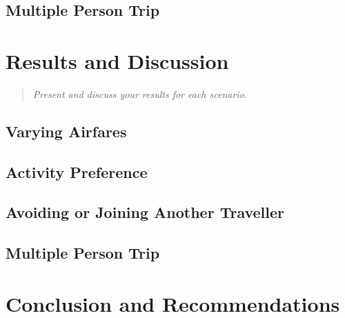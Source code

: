 \documentclass[12pt]{article}
\begin{document}
\subsection{Multiple Person Trip}




\pagebreak

\section{Results and Discussion} 
\label{sec:results}


\begin{quote} \textit{
Present and discuss your results for each scenario.
} \end{quote}

\lipsum[3]

\subsection{Varying Airfares}


\subsection{Activity Preference}


\subsection{Avoiding or Joining Another Traveller}


\subsection{Multiple Person Trip}


\pagebreak

\section{Conclusion and Recommendations}
\label{sec:conc}
\end{document}
